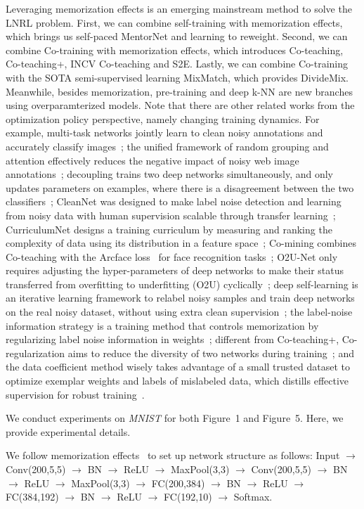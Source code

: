 Leveraging memorization effects is an emerging mainstream method to solve the LNRL problem. First, we can combine self-training with memorization effects, which brings us self-paced MentorNet and learning to reweight. Second, we can combine Co-training with memorization effects, which introduces Co-teaching, Co-teaching+, INCV Co-teaching and S2E. Lastly, we can combine Co-training with the SOTA semi-supervised learning MixMatch, which provides DivideMix. Meanwhile, besides memorization, pre-training and deep k-NN are new branches using overparamterized models.
Note that there are other related works from the optimization policy perspective, namely changing training dynamics. For example, multi-task networks jointly learn to clean noisy annotations and accurately classify images~; the unified framework of random grouping and attention effectively reduces the negative impact of noisy web image annotations~; decoupling trains two deep networks simultaneously, and only updates parameters on examples, where there is a disagreement between the two classifiers~;
CleanNet was designed to make label noise
detection and learning from noisy data with human supervision scalable through transfer learning~; CurriculumNet designs a training curriculum by measuring and ranking the complexity of data using its distribution in a feature space~; Co-mining combines Co-teaching with the Arcface loss~ for face recognition tasks~; O2U-Net only requires adjusting the hyper-parameters of deep networks to make their status transferred from overfitting to underfitting (O2U) cyclically~; deep self-learning is an iterative learning framework
to relabel noisy samples and train deep networks on the real
noisy dataset, without using extra clean supervision~; the label-noise information strategy is a training method that controls memorization by regularizing label noise information in weights~; different from Co-teaching+, Co-regularization aims to reduce the diversity of two networks during training~; and the data coefficient method wisely takes advantage of a small trusted dataset to optimize exemplar weights and labels of mislabeled data, which distills effective supervision for robust training~.

We conduct experiments on \textit{MNIST} for both Figure~1 and Figure~5. Here, we provide experimental details.

We follow memorization effects~ to set up network structure as follows: Input $\rightarrow$ Conv(200,5,5) $\rightarrow$ BN $\rightarrow$ ReLU $\rightarrow$ MaxPool(3,3) $\rightarrow$ Conv(200,5,5) $\rightarrow$ BN $\rightarrow$ ReLU $\rightarrow$ MaxPool(3,3) $\rightarrow$ FC(200,384) $\rightarrow$ BN $\rightarrow$ ReLU $\rightarrow$ FC(384,192) $\rightarrow$ BN $\rightarrow$ ReLU $\rightarrow$ FC(192,10) $\rightarrow$ Softmax.

